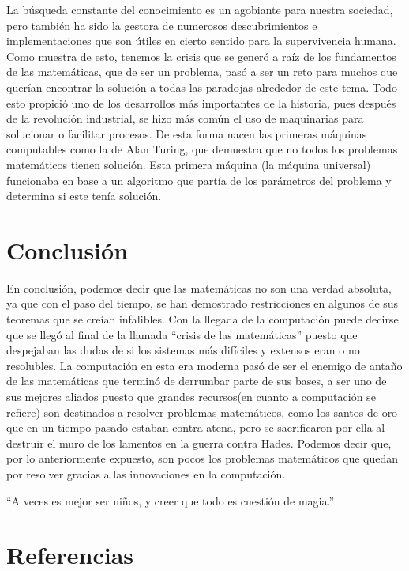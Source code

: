 \documentclass{article}
\begin{document}
La búsqueda constante del conocimiento es un agobiante para nuestra sociedad, pero también ha sido la gestora de numerosos descubrimientos e implementaciones que son útiles en cierto sentido para la supervivencia humana. Como muestra de esto, tenemos la crisis que se generó a raíz de los fundamentos de las matemáticas, que de ser un problema, pasó a ser un reto para muchos que querían encontrar la solución a todas las paradojas alrededor de este tema. Todo esto propició uno de los desarrollos más importantes de la historia, pues después de la revolución industrial, se hizo más común el uso de maquinarias para solucionar o facilitar procesos. De esta forma nacen las primeras máquinas computables como la de  Alan Turing, que demuestra que no todos los problemas matemáticos tienen solución. Esta primera máquina (la máquina universal) funcionaba en base a un algoritmo que partía de los parámetros del problema y determina si este tenía solución.


\section*{Conclusión}
En conclusión, podemos decir que las matemáticas no son una verdad absoluta, ya que con el paso del tiempo, se han demostrado restricciones en algunos de sus teoremas que se creían infalibles. Con la llegada de la computación puede decirse que se llegó al final de la llamada “crisis de las matemáticas” puesto que despejaban  las dudas de si los sistemas más difíciles y extensos eran o no resolubles. La computación en esta era moderna pasó de ser el enemigo de antaño de las matemáticas que terminó de derrumbar parte de sus bases, a ser uno de sus mejores aliados puesto que grandes recursos(en cuanto a computación se refiere) son destinados a resolver problemas matemáticos, como los santos de oro que en un tiempo pasado estaban contra atena, pero se sacrificaron por ella al destruir el muro de los lamentos en la guerra contra Hades. Podemos decir que, por lo anteriormente expuesto, son pocos los problemas matemáticos que quedan por resolver gracias a las innovaciones en la computación.

 
 
 
 
“A veces es mejor ser niños, y creer que todo es cuestión de magia.”


\section*{Referencias}
\small 
\end{document}
